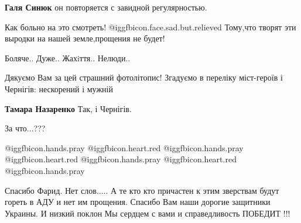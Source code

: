 \begin{itemize}
\textbf{Галя Синюк} он повторяется с завидной регулярностью.

Как больно на это смотреть! @igg{fbicon.face.sad.but.relieved} 
Тому,что творят эти выродки на нашей земле,прощения не будет!

Боляче.. Дуже.. Жахiття.. Нелюди..


Дякуємо Вам за цей страшний фотолітопис! Згадуємо в переліку міст-героїв і
Чернігів: нескорений і мужній

\textbf{Тамара Назаренко}
Так, і Чернігів.

За что...???


 @igg{fbicon.hands.pray} @igg{fbicon.heart.red} @igg{fbicon.hands.pray} @igg{fbicon.heart.red} @igg{fbicon.hands.pray} @igg{fbicon.heart.red} @igg{fbicon.hands.pray} 


Спасибо Фарид. Нет слов..... А те кто кто причастен к этим зверствам будут
гореть в АДУ и нет им прощения. Спасибо Вам наши дорогие защитники Украины. И
низкий поклон Мы сердцем с вами и справедливость ПОБЕДИТ !!!

\end{itemize} %
